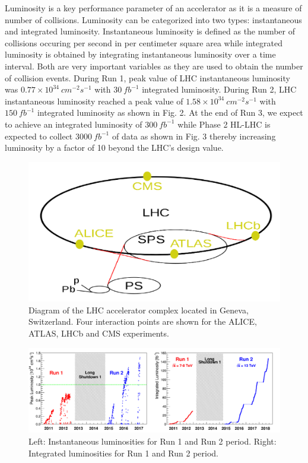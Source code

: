 Luminosity is a key performance parameter of an accelerator as it is a measure of number of collisions. Luminosity can be categorized into two types: instantaneous and integrated luminosity. Instantaneous luminosity is defined as the number of collisions occuring per second in per centimeter square area while integrated luminosity is obtained by integrating instantaneous luminosity over a time interval. Both are very important variables as they are used to obtain the number of collision events. During Run 1, peak value of LHC instantaneous luminosity was $0.77 \times 10^{34} \: cm^{-2} s^{-1} $ with $30 \: fb^{-1}$ integrated luminosity. During Run 2, LHC instantaneous luminosity reached a peak value of $1.58 \times 10^{34}  \: cm^{-2} s^{-1}$ with $150 \: fb^{-1}$ integrated luminosity as shown in Fig. 2. At the end of Run 3, we expect to achieve an integrated luminosity  of $300 \:fb^{-1}$ while Phase 2 HL-LHC is expected to collect $3000 \:fb^{-1}$ of data as shown in Fig. 3 thereby increasing luminosity by a factor of 10 beyond the LHC's design value. \\


\begin{figure}[H]
  \centering
  \includegraphics[width=0.8\columnwidth]{./LHCcomplex.png}
  \caption{\onehalfspacing Diagram of the LHC accelerator complex located in Geneva, Switzerland. Four interaction points are shown for the ALICE, ATLAS, LHCb and CMS experiments.}
  \label{fig:LHC}
\end{figure}


\begin{figure}[H]
  \centering
  \includegraphics[width=1 \columnwidth]{./run1-2_lumi.png}
  \caption{\onehalfspacing Left: Instantaneous luminosities for Run 1 and Run 2 period. Right: Integrated luminosities for Run 1 and Run 2 period.}
  \label{fig:LHClumi}
\end{figure}


